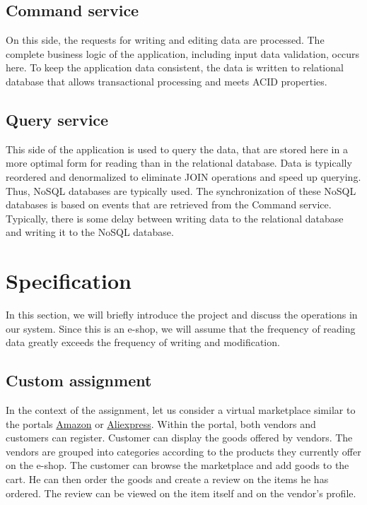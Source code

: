 \documentclass[12pt,english]{article}
\begin{document}
\subsection*{Command service}
On this side, the requests for writing and editing data are processed. The complete business logic of the application, including input data validation, occurs here. To keep the application data consistent, the data is written to relational database that allows transactional processing and meets ACID properties.
 
\subsection*{Query service}
This side of the application is used to query the data, that are stored here in a more optimal form for reading than in the relational database. Data is typically reordered and denormalized to eliminate JOIN operations and speed up querying. Thus, NoSQL databases are typically used. The synchronization of these NoSQL databases is based on events that are retrieved from the Command service. Typically, there is some delay between writing data to the relational database and writing it to the NoSQL database.

\section{Specification}
In this section, we will briefly introduce the project and discuss the operations in our system. Since this is an e-shop, we will assume that the frequency of reading data greatly exceeds the frequency of writing and modification.


\subsection{Custom assignment}
In the context of the assignment, let us consider a virtual marketplace similar to the portals \href{www.amazon.com}{Amazon} or \href{www.aliexpress.com}{Aliexpress}. Within the portal, both vendors and customers can register. Customer can display the goods offered by vendors. The vendors are grouped into categories according to the products they currently offer on the e-shop. The customer can browse the marketplace and add goods to the cart. He can then order the goods and create a review on the items he has ordered. The review can be viewed on the item itself and on the vendor's profile.

\newpage
\end{document}
